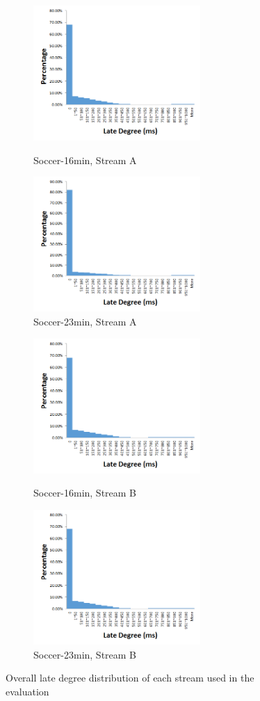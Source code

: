 \documentclass[a4paper, 11pt, twoside]{report}
\begin{document}
\begin{figure}[h]
	\centering
	\begin{subfigure}[t]{2.4in}
		\centering
		\includegraphics[width=2.5in]{late_degree_distribution-16min_A}
		\caption{Soccer-16min, Stream A}
		\hspace{5pt}
		\includegraphics[width=2.5in]{late_degree_distribution-23min_A}
		\caption{Soccer-23min, Stream A}	
	\end{subfigure}
	\quad
	\begin{subfigure}[t]{2.4in}
		\centering
		\includegraphics[width=2.5in]{late_degree_distribution-16min_B}
		\caption{Soccer-16min, Stream B}
		\hspace{5pt}
		\includegraphics[width=2.5in]{late_degree_distribution-23min_B}
		\caption{Soccer-23min, Stream B}
	\end{subfigure}
	\caption{Overall late degree distribution of each stream used in the evaluation}\label{fig:dataset-late-degree-distribution}
\end{figure}
\end{document}
